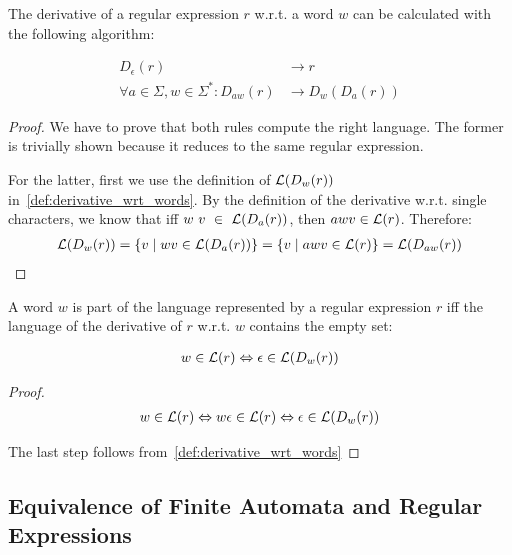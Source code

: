 \begin{theorem}
    The derivative of a regular expression $r$ w.r.t. a word $w$ can be calculated with the following algorithm:

    \begin{align}
        D_\epsilon(r) &\rightarrow r \\
        \forall a \in \Sigma, w \in \Sigma^\ast: D_{a w}(r) &\rightarrow D_w(D_a(r))
    \end{align}
\end{theorem}

\begin{proof}
    We have to prove that both rules compute the right language.
    The former is trivially shown because it reduces to the same regular expression.

    For the latter, first we use the definition of $\mathcal{L}(D_w(r))$ in~\ref{def:derivative_wrt_words}.
    By the definition of the derivative w.r.t. single characters,
    we know that iff $w~v~\in~\mathcal{L}(D_a(r))$, then $a w v \in \mathcal{L}(r)$.
    Therefore:
    \begin{align}
        \mathcal{L}(D_w(r))
            = \{ v \mid w v \in \mathcal{L}(D_a(r)) \}
            = \{ v \mid a w v \in \mathcal{L}(r) \}
            = \mathcal{L}(D_{a w}(r))
    \end{align}
\end{proof}

\begin{theorem}
    A word $w$ is part of the language represented by a regular expression $r$ iff
    the language of the derivative of $r$ w.r.t. $w$ contains the empty set:

    \begin{align}
        w \in \mathcal{L}(r) \Leftrightarrow \epsilon \in \mathcal{L}(D_w(r))
    \end{align}
\end{theorem}

\begin{proof}
    \begin{align}
        w \in \mathcal{L}(r) \Leftrightarrow w \epsilon \in \mathcal{L}(r) \Leftrightarrow \epsilon \in \mathcal{L}(D_w(r))
    \end{align}

    The last step follows from~\ref{def:derivative_wrt_words}
\end{proof}

\subsection{Equivalence of Finite Automata and Regular Expressions}

